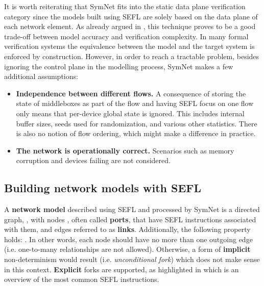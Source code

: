 \bigskip

It is worth reiterating that SymNet fits into the static data plane
verification category since the models built using SEFL are solely based on the
data plane of each network element.  As already argued in
, this technique proves to be a
good trade-off between model accuracy and verification complexity.  In many
formal verification systems the equivalence between the model and the target
system is enforced by construction.  However, in order to reach a tractable
problem, besides ignoring the control plane in the modelling process, SymNet
makes a few additional assumptions:
\begin{itemize}
  \item \textbf{Independence between different flows.} A consequence of
    storing the state of middleboxes as part of the flow and having SEFL focus
    on one flow only means that per-device global state is ignored.  This
    includes internal buffer sizes, seeds used for randomization, and various
    other statistics. There is also no notion of flow ordering, which might
    make a difference in practice.
  \item \textbf{The network is operationally correct.} Scenarios such as memory
    corruption and devices failing are not considered.
\end{itemize}


\subsection{Building network models with SEFL}\label{sub-sec:building-models}

A \textbf{network model} described using SEFL and processed by SymNet is a
directed graph, , with nodes , often
called \textbf{ports}, that have SEFL instructions associated with them, and
edges  referred to as \textbf{links}.  Additionally, the
following property holds: . In
other words, each node should have no more than one outgoing edge (i.e.
one-to-many relationships are not allowed). Otherwise, a form of
\textbf{implicit} non-determinism would result (i.e.  \emph{unconditional
fork}) which does not make sense in this context.  \textbf{Explicit} forks are
supported, as highlighted in  which is an
overview of the most common SEFL instructions.

